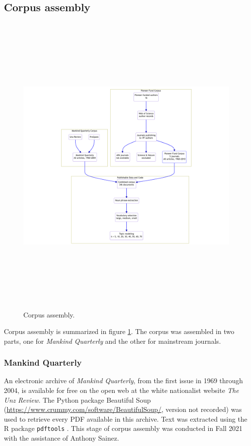 \documentclass[12pt]{article}
\begin{document}
\hypertarget{corpus-assembly}{%
\subsection*{Corpus assembly}\label{corpus-assembly}}

\begin{figure}
\centering
\includegraphics[width=8in,height=6.1in]{img/dataset.png}
\caption{Corpus assembly. \label{fig:corpus}}
\end{figure}

Corpus assembly is summarized in figure \ref{fig:corpus}. The corpus was assembled in two parts, one for \emph{Mankind Quarterly} and the other for mainstream journals.

\hypertarget{mankind-quarterly}{%
\subsubsection*{Mankind Quarterly}\label{mankind-quarterly}}

An electronic archive of \emph{Mankind Quarterly}, from the first issue in 1969 through 2004, is available for free on the open web at the white nationalist website \emph{The Unz Review}. The Python package Beautiful Soup (\url{https://www.crummy.com/software/BeautifulSoup/}, version not recorded) was used to retrieve every PDF available in this archive. Text was extracted using the R package \texttt{pdftools} \cite[3.0.1]{OomsPdftoolsTextExtraction2023}. This stage of corpus assembly was conducted in Fall 2021 with the assistance of Anthony Sainez.
\end{document}
